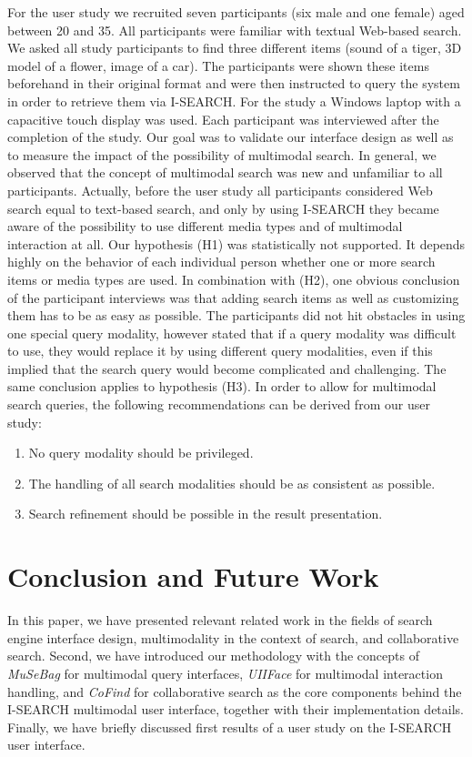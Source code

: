 \documentclass[runningheads,a4paper]{llncs} \usepackage[utf8]{inputenc}
\begin{document}
For the user study we recruited seven participants (six male and one female) aged between 20 and 35. All participants were familiar with textual Web-based search. We asked all study participants to find three different items (sound of
a tiger, 3D model of a flower, image of a car). The participants were shown these items beforehand in their original format and were then instructed to query the system in order to retrieve them via \mbox{I-SEARCH}. For the study a Windows laptop with a capacitive touch display was used. Each participant was interviewed after the completion of the study. Our goal was to validate our interface design as well as to measure the impact of the possibility of multimodal search. In general, we observed that the concept of multimodal search was new and unfamiliar to all participants. Actually, before the user study all participants considered Web search equal to text-based search, and only by using \mbox{I-SEARCH} they became aware of the possibility to use different media types and of multimodal interaction at all. Our hypothesis (H1) was statistically not supported. It depends highly on the behavior of each individual person whether one or more search items or media types are used. In combination with (H2), one obvious conclusion of the participant interviews was that adding search items as well as customizing them has to be as easy as possible. The participants did not hit obstacles in using one special query modality, however stated that if a query modality was
difficult to use, they would replace it by using different query modalities, even if this implied that the search query would become complicated and challenging. The same conclusion applies to hypothesis (H3). In order to allow for  multimodal search queries, the following recommendations can be derived from our user study: 
\begin{enumerate}
  \item No query modality should be privileged.
  \item The handling of all search modalities should be as consistent as possible.
  \item Search refinement should be possible in the result presentation.  
\end{enumerate}

\section{Conclusion and Future Work}
In this paper, we have presented relevant related work in the fields of search engine interface design, multimodality in the context of search, and collaborative search. Second, we have introduced our methodology with the concepts of \emph{MuSeBag} for multimodal query interfaces, \emph{UIIFace} for multimodal interaction handling, and \emph{CoFind} for collaborative search as the core components behind the \mbox{I-SEARCH} multimodal user interface, together with their implementation details. Finally, we have briefly discussed first results of a user study on the \mbox{I-SEARCH} user interface.
\end{document}
